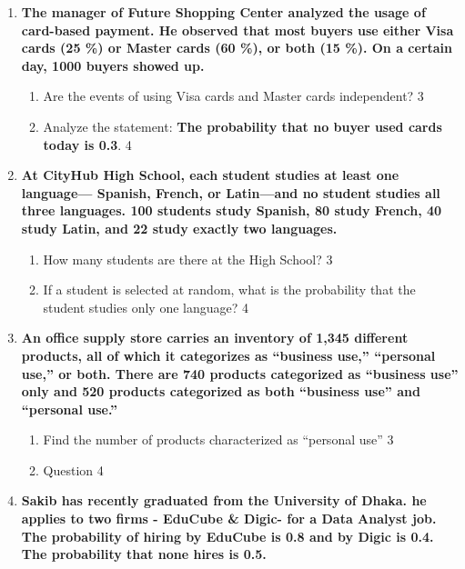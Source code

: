 \documentclass[a4paper,oneside, margin=1.4in]{book}
\begin{document}
\begin{enumerate}
   \item
	  \textbf{The manager of Future Shopping Center analyzed the usage of card-based payment. He observed that most buyers use either Visa cards (25 \%) or Master cards (60 \%), or both (15 \%). On a certain day, 1000 buyers showed up.} 
  
  \begin{enumerate}
    \item  
	Are the events of using Visa cards and Master cards independent? \hfill 3
    \item
	Analyze the statement: \textbf{The probability that no buyer used cards today is 0.3}. \hfill 4
  \end{enumerate}
  
   \item
	  \textbf{At CityHub High School, each student studies at least one language— Spanish, French, or Latin—and no student studies all three languages. 100 students study Spanish, 80 study French, 40 study Latin, and 22 study exactly two languages.} 
  
  \begin{enumerate}
    \item  
	How many students are there at the High School? \hfill 3
    \item
	If a student is selected at random, what is the probability that the student studies only one language? \hfill 4
  \end{enumerate}

 \item
	  \textbf{An office supply store carries an inventory of 1,345 different products, all of which it categorizes as “business use,” “personal use,” or both. There are 740 products categorized as “business use” only and 520 products categorized as both “business use” and “personal use.”} 
  
  \begin{enumerate}
    \item  
	Find the number of products characterized as “personal use” \hfill 3
    \item
	Question \hfill 4
  \end{enumerate}

  
   \item
  \textbf{Sakib has recently graduated from the University of Dhaka. he applies to two firms - EduCube \& Digic- for a Data Analyst job. The probability of hiring by EduCube is 0.8 and by Digic is 0.4. The probability that none hires is 0.5.} 
  

\end{enumerate}
\end{document}
